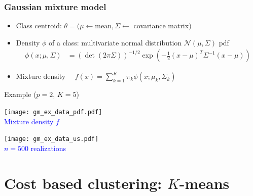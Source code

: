 \documentclass[compress, smaller, serif, 9pt]{beamer}
\begin{document}
\begin{frame}
   \frametitle{Gaussian mixture model}
   \begin{itemize}

      \item Class centroid: $\theta=(\mu \leftarrow \textrm{mean}, \Sigma \leftarrow$   covariance matrix$)$
      \item Density $\phi$ of a class: multivariate normal distribution $\mathcal{N}(\mu,\Sigma)$ pdf
      \begin{align*}
	\phi(x ;\mu,\Sigma) &= \left( \det{(2 \pi \Sigma )}\right)^{-1/2}
	\exp{\left( -\frac{1}{2}(x-\mu)^T \Sigma^{-1} (x-\mu) \right) }
      \end{align*}
      \item Mixture density $\quad f(x)= \sum_{k=1}^K \pi_k \phi\left( x ; \mu_k,\Sigma_k \right)$
 \end{itemize}
 \begin{block}{Example ($p=2$, $K=5$)}
 \end{block}

 \begin{minipage}{.49\textwidth}
 \begin{center}
    \texttt{[image: gm\_ex\_data\_pdf.pdf]}\\
    \textcolor{blue}{Mixture density $f$}
 \end{center}
 \end{minipage} \hfill
 \begin{minipage}{.49\textwidth}
 \begin{center}
    \texttt{[image: gm\_ex\_data\_us.pdf]}\\
    \textcolor{blue}{$n=500$ realizations}
 \end{center}
 \end{minipage}
\end{frame}

\section{Cost based clustering: $K$-means}
\end{document}
